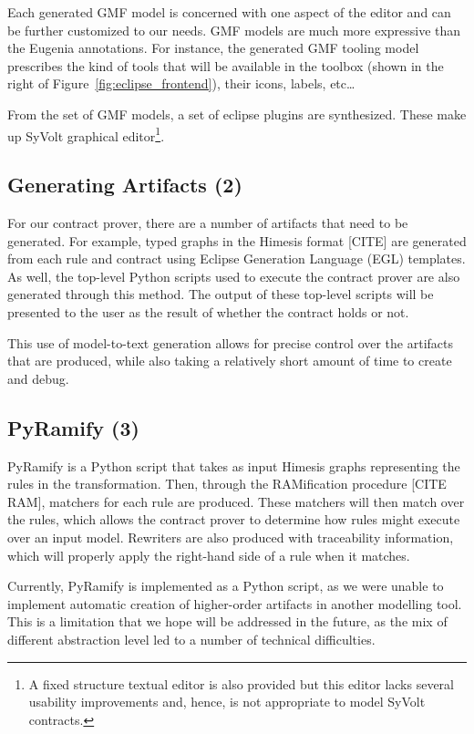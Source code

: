 Each generated GMF model is concerned with one aspect of the editor and can be further customized to our needs. GMF models are much more expressive than the Eugenia annotations.
For instance, the generated GMF tooling model prescribes the kind of tools that
will be available in the toolbox (shown in the right of
Figure~\ref{fig:eclipse_frontend}), their icons, labels, etc\ldots

From the set of GMF models, a set of eclipse plugins are synthesized.
These make up SyVolt graphical editor\footnote{A fixed structure textual editor is also provided but this editor lacks several usability improvements and, hence, is not appropriate to model SyVolt contracts.}.


\subsection{Generating Artifacts (2) }
For our contract prover, there are a number of artifacts that need to be generated. For example, typed graphs in the Himesis format [CITE] are generated from each rule and contract using Eclipse Generation Language (EGL) templates. As well, the top-level Python scripts used to execute the contract prover are also generated through this method. The output of these top-level scripts will be presented to the user as the result of whether the contract holds or not.

This use of model-to-text generation allows for precise control over the artifacts that are produced, while also taking a relatively short amount of time to create and debug.

\subsection{PyRamify (3)}

PyRamify is a Python script that takes as input Himesis graphs representing the rules in the transformation. Then, through the RAMification procedure [CITE RAM], matchers for each rule are produced. These matchers will then match over the rules, which allows the contract prover to determine how rules might execute over an input model. Rewriters are also produced with traceability information, which will properly apply the right-hand side of a rule when it matches.

Currently, PyRamify is implemented as a Python script, as we were unable to implement automatic creation of higher-order artifacts in another modelling tool. This is a limitation that we hope will be addressed in the future, as the mix of different abstraction level led to a number of technical difficulties.

